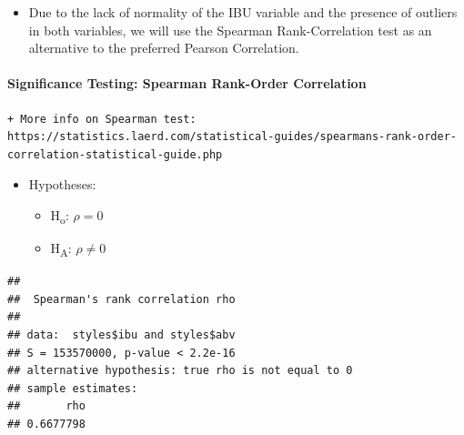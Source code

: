 \documentclass[]{article}
\newenvironment{Shaded}{\begin{snugshade}}{\end{snugshade}}
\newcommand{\KeywordTok}[1]{\textcolor[rgb]{0.13,0.29,0.53}{\textbf{#1}}}
\newcommand{\DataTypeTok}[1]{\textcolor[rgb]{0.13,0.29,0.53}{#1}}
\newcommand{\DecValTok}[1]{\textcolor[rgb]{0.00,0.00,0.81}{#1}}
\newcommand{\StringTok}[1]{\textcolor[rgb]{0.31,0.60,0.02}{#1}}
\newcommand{\CommentTok}[1]{\textcolor[rgb]{0.56,0.35,0.01}{\textit{#1}}}
\newcommand{\OtherTok}[1]{\textcolor[rgb]{0.56,0.35,0.01}{#1}}
\newcommand{\OperatorTok}[1]{\textcolor[rgb]{0.81,0.36,0.00}{\textbf{#1}}}
\newcommand{\NormalTok}[1]{#1}
\providecommand{\tightlist}{%
  \setlength{\itemsep}{0pt}\setlength{\parskip}{0pt}}
\let\oldparagraph\paragraph
\renewcommand{\paragraph}[1]{\oldparagraph{#1}\mbox{}}
\begin{document}
\begin{itemize}
\tightlist
\item
  Due to the lack of normality of the IBU variable and the presence of
  outliers in both variables, we will use the Spearman Rank-Correlation
  test as an alternative to the preferred Pearson Correlation.
\end{itemize}

\paragraph{Significance Testing: Spearman Rank-Order
Correlation}\label{significance-testing-spearman-rank-order-correlation}

\begin{verbatim}
+ More info on Spearman test: https://statistics.laerd.com/statistical-guides/spearmans-rank-order-correlation-statistical-guide.php
\end{verbatim}

\begin{itemize}
\tightlist
\item
  Hypotheses:

  \begin{itemize}
  \tightlist
  \item
    H\textsubscript{o}: \(\rho= 0\)
  \item
    H\textsubscript{A}: \(\rho\neq 0\)
  \end{itemize}
\end{itemize}

\begin{Shaded}
\end{Shaded}

\begin{verbatim}
## 
##  Spearman's rank correlation rho
## 
## data:  styles$ibu and styles$abv
## S = 153570000, p-value < 2.2e-16
## alternative hypothesis: true rho is not equal to 0
## sample estimates:
##       rho 
## 0.6677798
\end{verbatim}
\end{document}
